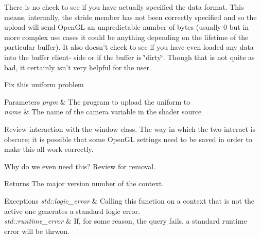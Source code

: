 \begin{DoxyRefList}
\item[\label{todo__todo000011}%
\hypertarget{todo__todo000011}{}%
Member \hyperlink{classgfx_1_1buffer_a7019485ae327de1d5d5525185196ff43}{gfx\-:\-:buffer\-:\-:upload\-\_\-data} ()]There is no check to see if you have actually specified the data format. This means, internally, the stride member has not been correctly specified and so the upload will send Open\-G\-L an unpredictable number of bytes (usually 0 but in more complex use cases it could be anything depending on the lifetime of the particular buffer). It also doesn't check to see if you have even loaded any data into the buffer client-\/ side or if the buffer is \char`\"{}dirty\char`\"{}. Though that is not quite as bad, it certainly isn't very helpful for the user.  
\item[\label{todo__todo000015}%
\hypertarget{todo__todo000015}{}%
Member \hyperlink{classgfx_1_1camera_a209884984c107ef76442b6408dc4f822}{gfx\-:\-:camera\-:\-:upload\-\_\-uniform} (program \&prgm, std\-::string const \&name)]Fix this uniform problem 
\begin{DoxyParams}{Parameters}
{\em prgm} & The program to upload the uniform to \\
\hline
{\em name} & The name of the camera variable in the shader source  \\
\hline
\end{DoxyParams}

\item[\label{todo__todo000006}%
\hypertarget{todo__todo000006}{}%
Class \hyperlink{classgfx_1_1context}{gfx\-:\-:context} ]Review interaction with the window class. The way in which the two interact is obscure; it is possible that some Open\-G\-L settings need to be saved in order to make this all work correctly. 
\item[\label{todo__todo000003}%
\hypertarget{todo__todo000003}{}%
Member \hyperlink{classgfx_1_1context_aa16d73f975660c691ec1b23d2b357838}{gfx\-:\-:context\-:\-:major\-\_\-version} () const ]Why do we even need this? Review for removal. \begin{DoxyReturn}{Returns}
The major version number of the context. 
\end{DoxyReturn}

\begin{DoxyExceptions}{Exceptions}
{\em std\-::logic\-\_\-error} & Calling this function on a context that is not the active one generates a standard logic error. \\
\hline
{\em std\-::runtime\-\_\-error} & If, for some reason, the query fails, a standard runtime error will be thrwon.  \\
\hline
\end{DoxyExceptions}


\end{DoxyRefList}
